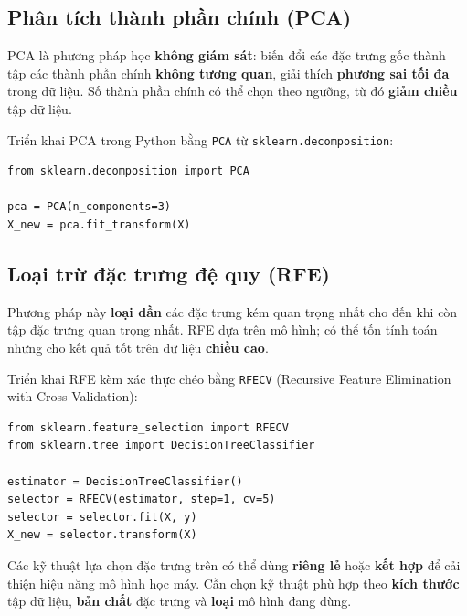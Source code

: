 \subsection{Phân tích thành phần chính (PCA)}

\begin{dinhnghia}[title={PCA trong ngữ cảnh lựa chọn đặc trưng}]
PCA là phương pháp học \textbf{không giám sát}: biến đổi các đặc trưng gốc thành tập các thành phần chính \textbf{không tương quan}, giải thích \textbf{phương sai tối đa} trong dữ liệu. Số thành phần chính có thể chọn theo ngưỡng, từ đó \textbf{giảm chiều} tập dữ liệu.
\end{dinhnghia}

\begin{vidu}[title={PCA trong Python}]
Triển khai PCA trong Python bằng \texttt{PCA} từ \texttt{sklearn.decomposition}:
\begin{lstlisting}
from sklearn.decomposition import PCA

pca = PCA(n_components=3)
X_new = pca.fit_transform(X)
\end{lstlisting}
\end{vidu}

\subsection{Loại trừ đặc trưng đệ quy (RFE)}

\begin{phuongphap}[title={RFE --- Recursive Feature Elimination}]
Phương pháp này \textbf{loại dần} các đặc trưng kém quan trọng nhất cho đến khi còn tập đặc trưng quan trọng nhất. RFE dựa trên mô hình; có thể tốn tính toán nhưng cho kết quả tốt trên dữ liệu \textbf{chiều cao}.
\end{phuongphap}

\begin{vidu}[title={RFECV trong Python}]
Triển khai RFE kèm xác thực chéo bằng \texttt{RFECV} (Recursive Feature Elimination with Cross Validation):
\begin{lstlisting}
from sklearn.feature_selection import RFECV
from sklearn.tree import DecisionTreeClassifier

estimator = DecisionTreeClassifier()
selector = RFECV(estimator, step=1, cv=5)
selector = selector.fit(X, y)
X_new = selector.transform(X)
\end{lstlisting}
\end{vidu}

\begin{ynghia}[title={Kết hợp các kỹ thuật}]
Các kỹ thuật lựa chọn đặc trưng trên có thể dùng \textbf{riêng lẻ} hoặc \textbf{kết hợp} để cải thiện hiệu năng mô hình học máy. Cần chọn kỹ thuật phù hợp theo \textbf{kích thước} tập dữ liệu, \textbf{bản chất} đặc trưng và \textbf{loại} mô hình đang dùng.
\end{ynghia}

